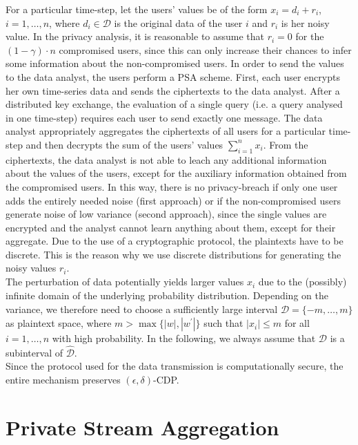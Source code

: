 \documentclass[10pt]{extarticle}
\begin{document}
For a particular time-step, let the users' values be of the form $x_i=d_i+r_i$, $i=1,\ldots,n$, where $d_i\in\mathcal{D}$ is the original data of the user $i$ and $r_i$ is her noisy value. In the privacy analysis, it is reasonable to assume that $r_i=0$ for the $(1-\gamma)\cdot n$ compromised users, since this can only increase their chances to infer some information about the non-compromised users. In order to send the values to the data analyst, the users perform a PSA scheme. First, each user encrypts her own time-series data and sends the ciphertexts to the data analyst. After a distributed key exchange, the evaluation of a single query (i.e. a query analysed in one time-step) requires each user to send exactly one message. The data analyst appropriately aggregates the ciphertexts of all users for a particular time-step and then decrypts the sum of the users' values $\sum_{i=1}^n x_i$. From the ciphertexts, the data analyst is not able to leach any additional information about the values of the users, except for the auxiliary information obtained from the compromised users. In this way, there is no privacy-breach if only one user adds the entirely needed noise (first approach) or if the non-compromised users generate noise of low variance (second approach), since the single values are encrypted and the analyst cannot learn anything about them, except for their aggregate. Due to the use of a cryptographic protocol, the plaintexts have to be discrete. This is the reason why we use discrete distributions for generating the noisy values $r_i$.\\
The perturbation of data potentially yields larger values $x_i$ due to the (possibly) infinite domain of the underlying probability distribution. Depending on the variance, we therefore need to choose a sufficiently large interval $\widehat{\mathcal{D}}=\{-m,\ldots,m\}$ as plaintext space, where $m>\max\{|w|,|w^\prime|\}$ such that $|x_i|\leq m$ for all $i=1,\ldots,n$ with high probability. In the following, we always assume that $\mathcal{D}$ is a subinterval of $\widehat{\mathcal{D}}$.\\
Since the protocol used for the data transmission is computationally secure, the entire mechanism preserves $(\epsilon,\delta)$-\mbox{\upshape\sffamily CDP}.




\section{Private Stream Aggregation}\label{psa}
\end{document}

